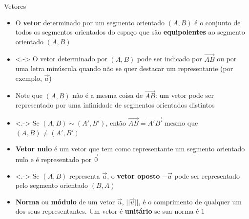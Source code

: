 \begin{frame}{Vetores}
    \begin{itemize}
        \item<+-> O \textbf{vetor} determinado por um segmento orientado \((A,B)\) é o conjunto de todos os segmentos orientados 
            do espaço que são \textbf{equipolentes} ao segmento orientado \((A,B)\)
        \item<.-> O vetor determinado por \((A,B)\) pode ser indicado por \(\vec{AB}\) ou por uma letra minúscula quando não se
            quer destacar um representante (por exemplo, \(\vec{a}\))
        \item<+-> Note que \((A,B)\) não é a mesma coisa de \(\vec{AB}\): um vetor pode ser representado por uma infinidade 
            de segmentos orientados distintos
        \item<.-> Se \((A,B) \sim (A',B')\), então \(\vec{AB} = \vec{A'B'}\) mesmo que \((A,B) \neq (A',B')\)
        \item<+-> \textbf{Vetor nulo} é um vetor que tem como representante um  segmento orientado nulo e 
            é representado por \(\vec{0}\)
        \item<.-> Se \((A,B)\) representa \(\vec{a}\), o \textbf{vetor oposto} \(-\vec{a}\) pode ser representado pelo 
            segmento orientado \((B,A)\)
        \item<+-> \textbf{Norma} ou \textbf{módulo} de um vetor \(\vec{u}\), \(||\vec{u}||\), é o comprimento de qualquer um dos 
            seus representantes. Um vetor é \textbf{unitário} se sua norma é 1
    \end{itemize}
\end{frame}

